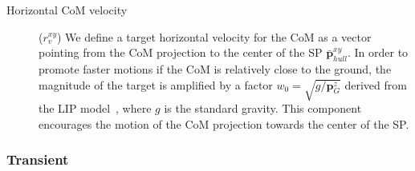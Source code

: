 \begin{addmargin}{0cm}
\begin{description}
\item[Horizontal CoM velocity]\!($r_{v}^{xy}$)\;
%
We define a target horizontal velocity for the \ac{CoM} as a vector pointing from the \ac{CoM} projection to the center of the \ac{SP} $\bar{\boldsymbol{p}}^{xy}_{hull}$.
In order to promote faster motions if the \ac{CoM} is relatively close to the ground, the magnitude of the target is amplified by a factor $w_0 = \sqrt{g / \boldsymbol{p}^z_{G}}$ derived from the \ac{LIP} model~\parencite{kajita_3d_2001}, where $g$ is the standard gravity.
This component encourages the motion of the \ac{CoM} projection towards the center of the \ac{SP}.

\end{description}

\end{addmargin}

\subsubsection{Transient}

